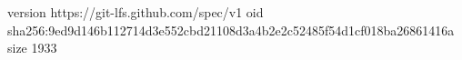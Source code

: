 version https://git-lfs.github.com/spec/v1
oid sha256:9ed9d146b112714d3e552cbd21108d3a4b2e2c52485f54d1cf018ba26861416a
size 1933
